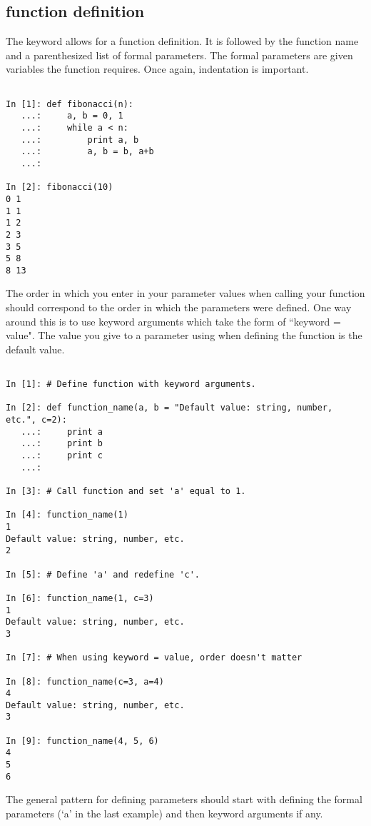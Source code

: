 \subsection*{function definition}
\begin{example}

The  keyword allows for a function definition. It is followed by 
the function name and a parenthesized list of formal parameters.
The formal parameters are given variables the function requires. 
Once again, indentation is important. 

\begin{lstlisting}

In [1]: def fibonacci(n):
   ...:     a, b = 0, 1
   ...:     while a < n:
   ...:         print a, b
   ...:         a, b = b, a+b
   ...:         

In [2]: fibonacci(10)
0 1
1 1
1 2
2 3
3 5
5 8
8 13

\end{lstlisting}

The order in which you enter in your parameter values when calling your function should correspond to the order in which the parameters were defined. One way around this is to use keyword arguments which take the form of ``keyword = value". The value you give to a parameter using \li{=} when defining the function is the default value.

\begin{lstlisting}

In [1]: # Define function with keyword arguments.

In [2]: def function_name(a, b = "Default value: string, number, etc.", c=2):
   ...:     print a
   ...:     print b
   ...:     print c
   ...:     

In [3]: # Call function and set 'a' equal to 1.

In [4]: function_name(1)
1
Default value: string, number, etc.
2

In [5]: # Define 'a' and redefine 'c'.

In [6]: function_name(1, c=3)
1
Default value: string, number, etc.
3

In [7]: # When using keyword = value, order doesn't matter

In [8]: function_name(c=3, a=4)
4
Default value: string, number, etc.
3

In [9]: function_name(4, 5, 6)
4
5
6

\end{lstlisting}

The general pattern for defining parameters should start with defining the formal parameters (`a' in the last example) and then keyword arguments if any.


\end{example}
